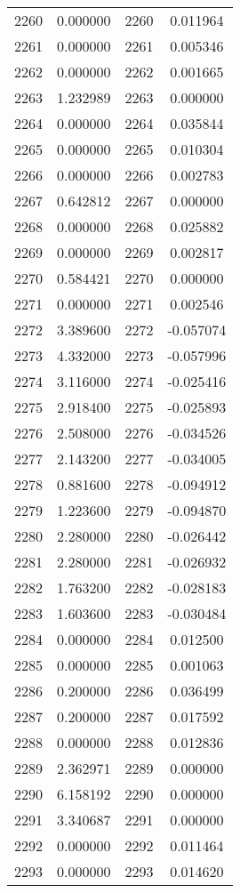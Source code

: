 \documentclass[12pt]{article}
\begin{document}
\begin{longtable}{@{}cccc@{}}
2260 & 0.000000 & 2260 & 0.011964 \\
2261 & 0.000000 & 2261 & 0.005346 \\
2262 & 0.000000 & 2262 & 0.001665 \\
2263 & 1.232989 & 2263 & 0.000000 \\
2264 & 0.000000 & 2264 & 0.035844 \\
2265 & 0.000000 & 2265 & 0.010304 \\
2266 & 0.000000 & 2266 & 0.002783 \\
2267 & 0.642812 & 2267 & 0.000000 \\
2268 & 0.000000 & 2268 & 0.025882 \\
2269 & 0.000000 & 2269 & 0.002817 \\
2270 & 0.584421 & 2270 & 0.000000 \\
2271 & 0.000000 & 2271 & 0.002546 \\
2272 & 3.389600 & 2272 & -0.057074 \\
2273 & 4.332000 & 2273 & -0.057996 \\
2274 & 3.116000 & 2274 & -0.025416 \\
2275 & 2.918400 & 2275 & -0.025893 \\
2276 & 2.508000 & 2276 & -0.034526 \\
2277 & 2.143200 & 2277 & -0.034005 \\
2278 & 0.881600 & 2278 & -0.094912 \\
2279 & 1.223600 & 2279 & -0.094870 \\
2280 & 2.280000 & 2280 & -0.026442 \\
2281 & 2.280000 & 2281 & -0.026932 \\
2282 & 1.763200 & 2282 & -0.028183 \\
2283 & 1.603600 & 2283 & -0.030484 \\
2284 & 0.000000 & 2284 & 0.012500 \\
2285 & 0.000000 & 2285 & 0.001063 \\
2286 & 0.200000 & 2286 & 0.036499 \\
2287 & 0.200000 & 2287 & 0.017592 \\
2288 & 0.000000 & 2288 & 0.012836 \\
2289 & 2.362971 & 2289 & 0.000000 \\
2290 & 6.158192 & 2290 & 0.000000 \\
2291 & 3.340687 & 2291 & 0.000000 \\
2292 & 0.000000 & 2292 & 0.011464 \\
2293 & 0.000000 & 2293 & 0.014620 \\

\end{longtable}
\end{document}
